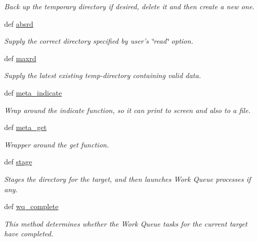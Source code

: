 \begin{DoxyCompactItemize}
\begin{DoxyCompactList}\small\item\em Back up the temporary directory if desired, delete it and then create a new one. \end{DoxyCompactList}\item 
def \hyperlink{classforcebalance_1_1target_1_1Target_abb0a6089d8deaead8f78186cc8e4cbe4}{absrd}
\begin{DoxyCompactList}\small\item\em Supply the correct directory specified by user's \char`\"{}read\char`\"{} option. \end{DoxyCompactList}\item 
def \hyperlink{classforcebalance_1_1target_1_1Target_a961ce7e772836b1465cb44e3f03145df}{maxrd}
\begin{DoxyCompactList}\small\item\em Supply the latest existing temp-\/directory containing valid data. \end{DoxyCompactList}\item 
def \hyperlink{classforcebalance_1_1target_1_1Target_a99c84ef8ea504d7699c927e261f648e4}{meta\-\_\-indicate}
\begin{DoxyCompactList}\small\item\em Wrap around the indicate function, so it can print to screen and also to a file. \end{DoxyCompactList}\item 
def \hyperlink{classforcebalance_1_1target_1_1Target_a17c8ac0c7dd0a0430accddfd12602103}{meta\-\_\-get}
\begin{DoxyCompactList}\small\item\em Wrapper around the get function. \end{DoxyCompactList}\item 
def \hyperlink{classforcebalance_1_1target_1_1Target_af8d2a4658c87841e40296795aec478bb}{stage}
\begin{DoxyCompactList}\small\item\em Stages the directory for the target, and then launches Work Queue processes if any. \end{DoxyCompactList}\item 
def \hyperlink{classforcebalance_1_1target_1_1Target_af6099ec09486213869dba2491bd8ea04}{wq\-\_\-complete}
\begin{DoxyCompactList}\small\item\em This method determines whether the Work Queue tasks for the current target have completed. \end{DoxyCompactList}\item 

\end{DoxyCompactItemize}
